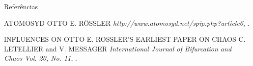 \documentclass{beamer}
\begin{document}
\begin{frame}{Referências}
	\begin{thebibliography}{3}
		
		\beamertemplatearticlebibitems
		\bibitem{}
		ATOMOSYD
		\newblock OTTO E. RÖSSLER
		\newblock\emph{http://www.atomosyd.net/spip.php?article6},
		.
		
		\beamertemplatearticlebibitems
		INFLUENCES ON OTTO E. ROSSLER’S EARLIEST PAPER ON CHAOS
		\newblock C. LETELLIER and V. MESSAGER
		\newblock\emph{International Journal of Bifurcation and Chaos Vol. 20, No. 11},
		.
		
	\end{thebibliography}
\end{frame}

\end{document}
